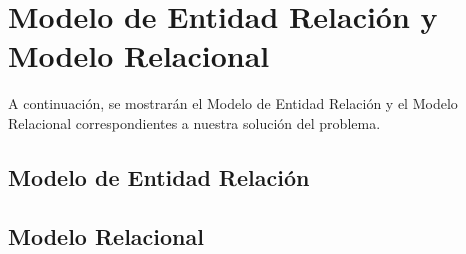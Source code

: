 \section{Modelo de Entidad Relación y Modelo Relacional}

A continuación, se mostrarán el Modelo de Entidad Relación y el Modelo Relacional correspondientes a nuestra solución del problema.

\subsection{Modelo de Entidad Relación}

\subsection{Modelo Relacional}

